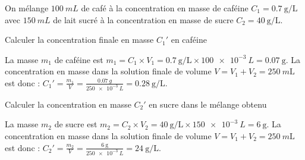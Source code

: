 \debutEntrainement

On mélange $\SI{100}{mL}$ de café à la concentration en masse de caféine $C_1=\SI{0,7}{\gram\per\liter}$ avec $\SI{150}{mL}$ de lait sucré à la concentration en masse de sucre $C_2=\SI{40}{\gram\per\liter}$. 

\begin{enonce}
Calculer la concentration finale en masse $C_1'$ en caféine
\end{enonce}


\begin{corrige}
La masse $m_1$ de caféine est $m_1=C_1\times V_1= \SI{0,7}{\gram\per\liter} \times\SI{100e-3}{L}=\SI{0,07}{\gram}$. La concentration en masse dans la solution finale de volume $V=V_1+V_2=\SI{250}{m\liter}$ est donc : $C_1'=\frac{m_1}{V}=\frac{\SI{0,07}{g}}{\SI{250e-3}{L}}=\SI{0,28}{\gram\per\liter}$.
\end{corrige}


\begin{enonce}
Calculer la concentration en masse $C_2'$ en sucre dans le mélange obtenu
\end{enonce}


\begin{corrige}
La masse $m_2$ de sucre est $m_2=C_2\times V_2=\SI{40}{\gram\per\liter}\times\SI{150e-3}{L}=\SI{6}{\gram}$. La concentration en masse dans la solution finale de volume $V=V_1+V_2=\SI{250}{m\liter}$ est donc : $C_2'=\frac{m_2}{V}=\frac{\SI{6}{\gram}}{\SI{250e-3}{L}}=\SI{24}{\gram\per\liter}$.
\end{corrige}

\finEntrainement




